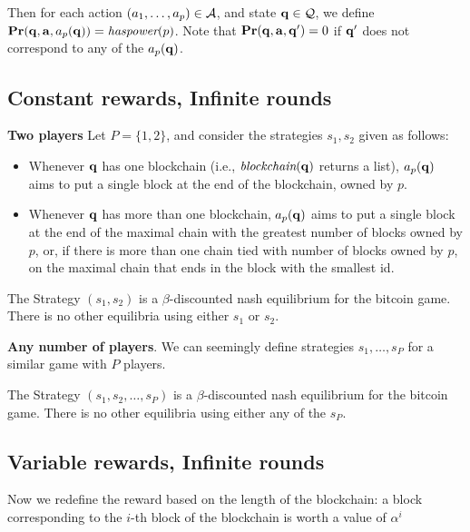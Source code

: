 Then for each action $(a_1,\dots,a_p) \in \mathcal{A}$, and state $\mathbf{q} \in \mathcal{Q}$, we 
define $\mathbf{Pr}(\mathbf{q}, \mathbf{a}, a_p(\mathbf{q})) = \textit{haspower}(p)$. Note that $\mathbf{Pr}(\mathbf{q}, \mathbf{a}, \mathbf{q}') = 0$ if $\mathbf{q}'$ does not correspond to any of the $a_p(\mathbf{q})$. 

\subsection{Constant rewards, Infinite rounds}

\medskip
\noindent
\textbf{Two players}
Let $P = \{1,2\}$, and consider the strategies $s_1,s_2$ given as follows: 
\begin{itemize}
\item Whenever $\mathbf{q}$ has one blockchain (i.e., $\textit{blockchain}(\mathbf{q})$ returns a list), $a_p(\mathbf{q})$ aims to put a single block at the end of the 
blockchain, owned by $p$. 
\item Whenever $\mathbf{q}$ has more than one blockchain, $a_p(\mathbf{q})$ aims to put a single block at the end of the maximal chain with the 
greatest number of blocks owned by $p$, or, if there is more than one chain tied with number of blocks owned by $p$, on the maximal chain that ends in the block with the smallest id. 
\end{itemize}

\begin{myprop}
The Strategy $(s_1,s_2)$ is a $\beta$-discounted nash equilibrium for the bitcoin game. There is no other equilibria using either $s_1$ or 
$s_2$. 
\end{myprop}


\medskip
\noindent
\textbf{Any number of players}. We can seemingly define strategies $s_1,\dots,s_P$ for a similar game with $P$ players. 

\begin{myprop}
The Strategy $(s_1,s_2,\dots,s_P)$ is a $\beta$-discounted nash equilibrium for the bitcoin game. There is no other equilibria using either any of the $s_P$. 
\end{myprop}

\subsection{Variable rewards, Infinite rounds}

Now we redefine the reward based on the length of the blockchain: a block corresponding to the $i$-th block of the blockchain is worth a value of $\alpha^i$
